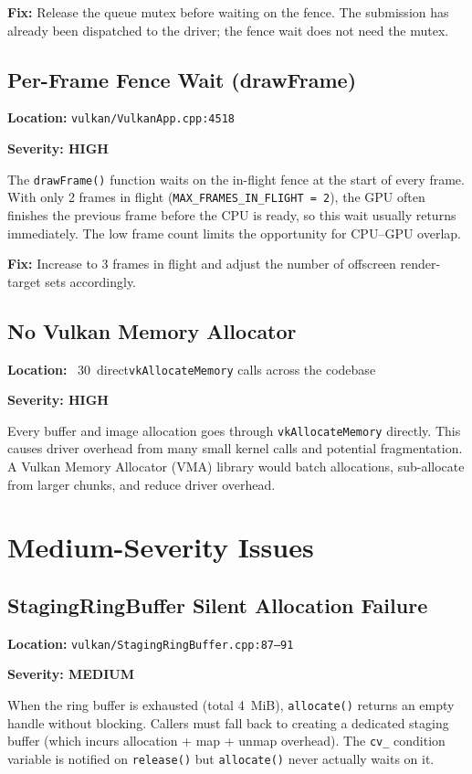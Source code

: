 \documentclass[a4paper,11pt]{article}
\begin{document}
\textbf{Fix:} Release the queue mutex before waiting on the fence. The
submission has already been dispatched to the driver; the fence wait does
not need the mutex.

\subsection{Per-Frame Fence Wait (drawFrame)}

\textbf{Location:} \texttt{vulkan/VulkanApp.cpp:4518}

\textbf{Severity: HIGH}

The \texttt{drawFrame()} function waits on the in-flight fence at the start
of every frame. With only 2 frames in flight
(\texttt{MAX\_FRAMES\_IN\_FLIGHT = 2}), the GPU often finishes the previous
frame before the CPU is ready, so this wait usually returns immediately. The
low frame count limits the opportunity for CPU--GPU overlap.

\textbf{Fix:} Increase to 3 frames in flight and adjust the number of
offscreen render-target sets accordingly.

\subsection{No Vulkan Memory Allocator}

\textbf{Location:} ~30~direct\texttt{vkAllocateMemory} calls across the
codebase

\textbf{Severity: HIGH}

Every buffer and image allocation goes through \texttt{vkAllocateMemory}
directly. This causes driver overhead from many small kernel calls and
potential fragmentation. A Vulkan Memory Allocator (VMA) library would
batch allocations, sub-allocate from larger chunks, and reduce driver
overhead.

\section{Medium-Severity Issues}

\subsection{StagingRingBuffer Silent Allocation Failure}

\textbf{Location:} \texttt{vulkan/StagingRingBuffer.cpp:87--91}

\textbf{Severity: MEDIUM}

When the ring buffer is exhausted (total 4~MiB), \texttt{allocate()} returns
an empty handle without blocking. Callers must fall back to creating a
dedicated staging buffer (which incurs allocation + map + unmap overhead).
The \texttt{cv\_} condition variable is notified on \texttt{release()} but
\texttt{allocate()} never actually waits on it.
\end{document}
